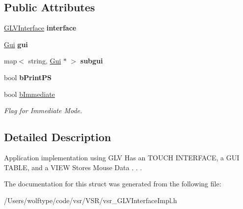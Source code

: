 \subsection*{Public Attributes}
\begin{DoxyCompactItemize}
\item 
\hypertarget{structvsr_1_1_g_l_v_app_aa103927a3d05dda6834d9c2d02d587c8}{\hyperlink{classvsr_1_1_g_l_v_interface}{G\-L\-V\-Interface} {\bfseries interface}}\label{structvsr_1_1_g_l_v_app_aa103927a3d05dda6834d9c2d02d587c8}

\item 
\hypertarget{structvsr_1_1_g_l_v_app_a4c26f0ca16c44fa5e9b15878dfe46a64}{\hyperlink{classglv_1_1_gui}{Gui} {\bfseries gui}}\label{structvsr_1_1_g_l_v_app_a4c26f0ca16c44fa5e9b15878dfe46a64}

\item 
\hypertarget{structvsr_1_1_g_l_v_app_aa540c78e5085daa89ec91eccf5f172a5}{map$<$ string, \hyperlink{classglv_1_1_gui}{Gui} $\ast$ $>$ {\bfseries subgui}}\label{structvsr_1_1_g_l_v_app_aa540c78e5085daa89ec91eccf5f172a5}

\item 
\hypertarget{structvsr_1_1_g_l_v_app_ade78b06a57396d0f443707a307d20c29}{bool {\bfseries b\-Print\-P\-S}}\label{structvsr_1_1_g_l_v_app_ade78b06a57396d0f443707a307d20c29}

\item 
\hypertarget{structvsr_1_1_g_l_v_app_a11930999c7da6dfba55bf99eb06ac2e5}{bool \hyperlink{structvsr_1_1_g_l_v_app_a11930999c7da6dfba55bf99eb06ac2e5}{b\-Immediate}}\label{structvsr_1_1_g_l_v_app_a11930999c7da6dfba55bf99eb06ac2e5}

\begin{DoxyCompactList}\small\item\em Flag for Immediate Mode. \end{DoxyCompactList}\end{DoxyCompactItemize}


\subsection{Detailed Description}
Application implementation using G\-L\-V Has an T\-O\-U\-C\-H I\-N\-T\-E\-R\-F\-A\-C\-E, a G\-U\-I T\-A\-B\-L\-E, and a V\-I\-E\-W Stores Mouse Data . . . 

The documentation for this struct was generated from the following file\-:\begin{DoxyCompactItemize}
\item 
/\-Users/wolftype/code/vsr/\-V\-S\-R/vsr\-\_\-\-G\-L\-V\-Interface\-Impl.\-h\end{DoxyCompactItemize}
